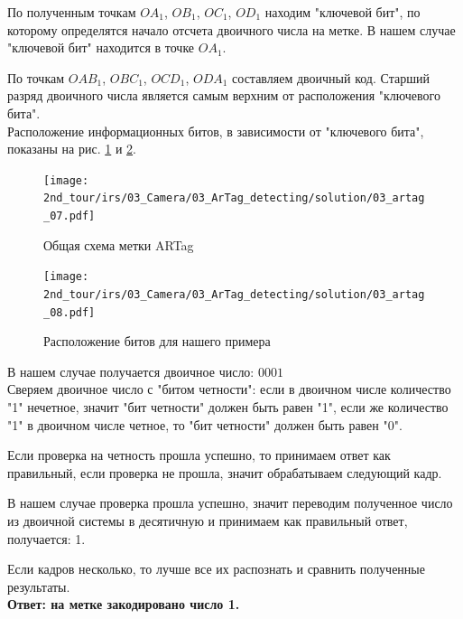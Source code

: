 По полученным точкам $OA_1$, $OB_1$, $OC_1$, $OD_1$ находим "ключевой бит", по которому определятся начало отсчета двоичного числа на метке. В нашем случае "ключевой бит" находится в точке $OA_1$.

По точкам $OAB_1$, $OBC_1$, $OCD_1$, $ODA_1$ составляем двоичный код. Старший разряд двоичного числа является самым верхним от расположения "ключевого бита". 
\\

Расположение информационных битов, в зависимости от "ключевого бита", показаны на рис. \ref{fig:03_artag_07} и \ref{fig:03_artag_08}.
\begin{figure}[H]
	\centering
	\texttt{[image: 2nd\_tour/irs/03\_Camera/03\_ArTag\_detecting/solution/03\_artag\_07.pdf]}
	\label{fig:03_artag_07}
	\caption{Общая схема метки ARTag}
\end{figure}

\begin{figure}[H]
	\centering
	\texttt{[image: 2nd\_tour/irs/03\_Camera/03\_ArTag\_detecting/solution/03\_artag\_08.pdf]}
	\label{fig:03_artag_08}
	\caption{Расположение битов для нашего примера}
\end{figure}

В нашем случае получается двоичное число: $0001$ \\
Сверяем двоичное число с "битом четности": если в двоичном числе количество "1" нечетное, значит "бит четности" должен быть равен "1", если же количество "1" в двоичном числе четное, то "бит четности" должен быть равен "0".

Если проверка на четность прошла успешно, то принимаем ответ как правильный, если проверка не прошла, значит обрабатываем следующий кадр.

В нашем случае проверка прошла успешно, значит переводим полученное число из двоичной системы в десятичную и принимаем как правильный ответ, получается: 1.

Если кадров несколько, то лучше все их распознать и сравнить полученные результаты.
\\

\textbf{Ответ: на метке закодировано число 1.}

\codeExample

